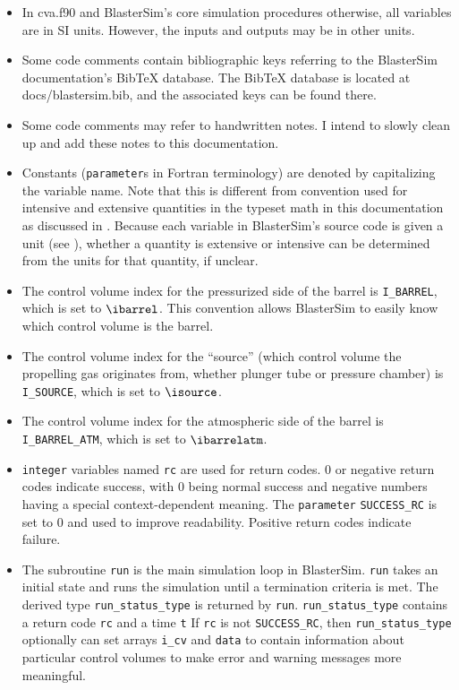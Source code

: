 \begin{itemize}
\item In cva.f90 and BlasterSim's core simulation procedures otherwise, all variables are in SI units.
However, the inputs and outputs may be in other units.

\item Some code comments contain bibliographic keys referring to the BlasterSim documentation's BibTeX database.
The BibTeX database is located at docs/blastersim.bib, and the associated keys can be found there.

\item Some code comments may refer to handwritten notes.
I intend to slowly clean up and add these notes to this documentation.

\item Constants (\texttt{parameter}s in Fortran terminology) are denoted by capitalizing the variable name.
Note that this is different from convention used for intensive and extensive quantities in the typeset math in this documentation as discussed in .
Because each variable in BlasterSim's source code is given a unit (see ), whether a quantity is extensive or intensive can be determined from the units for that quantity, if unclear.

\item The control volume index for the pressurized side of the barrel is \texttt{I\_BARREL}, which is set to $\ibarrel$.
This convention allows BlasterSim to easily know which control volume is the barrel.

\item The control volume index for the ``source'' (which control volume the propelling gas originates from, whether plunger tube or pressure chamber) is \texttt{I\_SOURCE}, which is set to $\isource$.

\item The control volume index for the atmospheric side of the barrel is \texttt{I\_BARREL\_ATM}, which is set to $\ibarrelatm$.

\item \texttt{integer} variables named \texttt{rc} are used for return codes.
0 or negative return codes indicate success, with 0 being normal success and negative numbers having a special context-dependent meaning.
The \texttt{parameter} \texttt{SUCCESS\_RC} is set to 0 and used to improve readability.
Positive return codes indicate failure.

\item The subroutine \texttt{run} is the main simulation loop in BlasterSim.
\texttt{run} takes an initial state and runs the simulation until a termination criteria is met.
The derived type \texttt{run\_status\_type} is returned by \texttt{run}.
\texttt{run\_status\_type} contains a return code \texttt{rc} and a time \texttt{t}
If \texttt{rc} is not \texttt{SUCCESS\_RC}, then \texttt{run\_status\_type} optionally can set arrays \texttt{i\_cv} and \texttt{data} to contain information about particular control volumes to make error and warning messages more meaningful.


\end{itemize}
